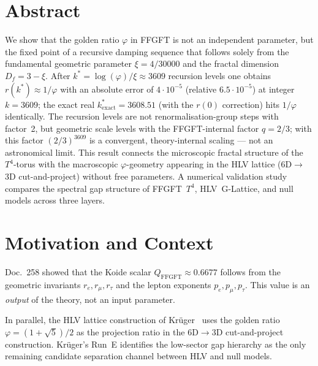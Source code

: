 
\section*{Abstract}
We show that the golden ratio $\varphi$ in FFGFT is not an independent
parameter, but the fixed point of a recursive damping sequence that follows
solely from the fundamental geometric parameter $\xi = 4/30000$ and the
fractal dimension $D_f = 3-\xi$. After
$k^* = \log(\varphi)/\xi \approx 3609$ recursion levels one obtains
$r(k^*) \approx 1/\varphi$ with an absolute error of $4{\cdot}10^{-5}$ (relative $6.5{\cdot}10^{-5}$) at integer $k=3609$; the exact real $k^*_\mathrm{exact}=3608.51$ (with the $r(0)$ correction) hits $1/\varphi$ identically.
The recursion levels are not renormalisation-group steps with factor~2,
but geometric scale levels with the FFGFT-internal factor $q = 2/3$;
with this factor $(2/3)^{3609}$ is a convergent, theory-internal
scaling --- not an astronomical limit.
This result connects the microscopic fractal structure of the $T^4$-torus
with the macroscopic $\varphi$-geometry appearing in the HLV lattice
(6D$\to$3D cut-and-project) without free parameters.
A numerical validation study compares the spectral gap structure of
FFGFT~$T^4$, HLV~G-Lattice, and null models across three layers.

\section{Motivation and Context}

Doc.~258 showed that the Koide scalar
$Q_\mathrm{FFGFT} \approx 0.6677$ follows from the geometric invariants
$r_e, r_\mu, r_\tau$ and the lepton exponents $p_e, p_\mu, p_\tau$.
This value is an \emph{output} of the theory, not an input parameter.

In parallel, the HLV lattice construction of Krüger~\cite{krueger275en}
uses the golden ratio $\varphi = (1+\sqrt{5})/2$ as the projection ratio
in the 6D$\to$3D cut-and-project construction. Krüger's Run~E identifies
the low-sector gap hierarchy as the only remaining candidate separation
channel between HLV and null models.

